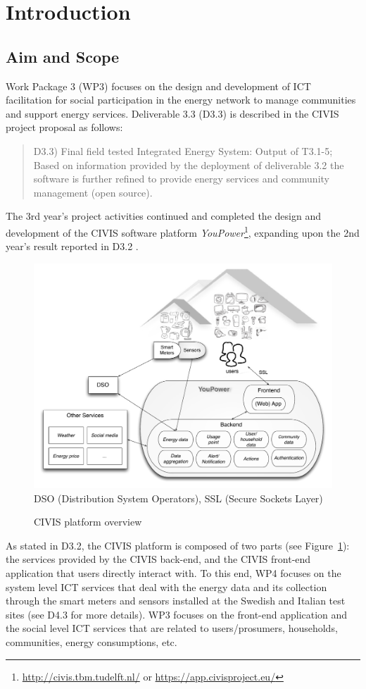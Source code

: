 
\section{Introduction}

\subsection{Aim and Scope} 

Work Package 3 (WP3) focuses on the design and development of ICT facilitation for social participation in the energy network to manage communities and support energy services. Deliverable 3.3 (D3.3) is described in the CIVIS project proposal as follows: 

\begin{quote}
D3.3) Final field tested Integrated Energy System: Output of T3.1-5; Based on information provided by the deployment of deliverable 3.2 the software is further refined to provide energy services and community management (open source). 
\end{quote}


The 3rd year's project activities continued and completed  the design and development of the CIVIS software platform \textit{YouPower}\footnote{\url{http://civis.tbm.tudelft.nl/} or \url{https://app.civisproject.eu/}}, 
expanding upon the 2nd year's result reported in D3.2 \citep{Huang2015c}. 
%
\begin{figure}[h!]
\begin{center}\footnotesize
	\includegraphics[width=.85\textwidth]{img/civis_platform_overview.pdf}\\
	DSO (Distribution System Operators),  SSL (Secure Sockets Layer)
	\caption{CIVIS platform overview}\label{fig:platform}
\end{center}
\end{figure}
% 
As stated in D3.2, the CIVIS platform is composed of two parts (see Figure~\ref{fig:platform}): 
the services provided by the CIVIS back-end, and the CIVIS front-end application that users directly interact with. 
%
To this end, WP4 focuses on the system level ICT services that deal with the energy data and its collection through the smart meters and sensors installed at the Swedish and Italian test sites (see D4.3 for more details). 
% 
WP3 focuses on the front-end application and the social level ICT services that are related to users/prosumers, households, communities, energy consumptions, etc. 

